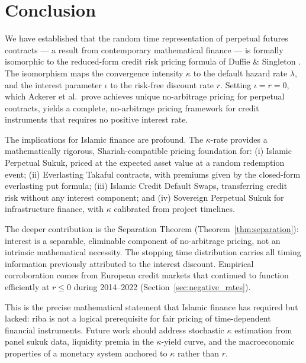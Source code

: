 \documentclass[10pt,twocolumn]{article}
\theoremstyle{plain}
\theoremstyle{definition}
\begin{document}
\section{Conclusion}
\label{sec:conclusion}

We have established that the random time representation of
perpetual futures contracts --- a result from contemporary
mathematical finance \cite{Ackerer2024} --- is formally
isomorphic to the reduced-form credit risk pricing formula of
Duffie \& Singleton \cite{DuffieSingleton1999}. The isomorphism
maps the convergence intensity $\kappa$ to the default hazard
rate $\lambda$, and the interest parameter $\iota$ to the
risk-free discount rate $r$. Setting $\iota = r = 0$, which
Ackerer et al.\ prove achieves unique no-arbitrage pricing for
perpetual contracts, yields a complete, no-arbitrage pricing
framework for credit instruments that requires no positive
interest rate.

The implications for Islamic finance are profound. The $\kappa$-rate
provides a mathematically rigorous, Shariah-compatible pricing
foundation for: (i) Islamic Perpetual Sukuk, priced at the
expected asset value at a random redemption event; (ii) Everlasting
Takaful contracts, with premiums given by the closed-form
everlasting put formula; (iii) Islamic Credit Default Swaps,
transferring credit risk without any interest component; and (iv)
Sovereign Perpetual Sukuk for infrastructure finance, with
$\kappa$ calibrated from project timelines.

The deeper contribution is the Separation Theorem
(Theorem~\ref{thm:separation}): interest is a separable,
eliminable component of no-arbitrage pricing, not an intrinsic
mathematical necessity. The stopping time distribution carries
all timing information previously attributed to the interest
discount. Empirical corroboration comes from European credit
markets that continued to function efficiently at $r \leq 0$
during 2014--2022 (Section~\ref{sec:negative_rates}).

This is the precise mathematical statement that Islamic finance
has required but lacked: riba is not a logical prerequisite for
fair pricing of time-dependent financial instruments. Future work
should address stochastic $\kappa$ estimation from panel sukuk
data, liquidity premia in the $\kappa$-yield curve, and the
macroeconomic properties of a monetary system anchored to $\kappa$
rather than $r$.
\end{document}

